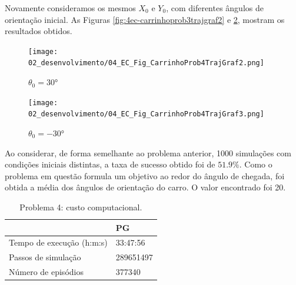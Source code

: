 Novamente consideramos os mesmos $X_0$ e $Y_0$, com diferentes ângulos de orientação inicial. As Figuras \ref{fig:4ec-carrinhoprob3trajgraf2} e \ref{fig:4ec-carrinhoprob4trajgraf3}, mostram os resultados obtidos.

\begin{figure}[H]
	\centering
	\texttt{[image: 02\_desenvolvimento/04\_EC\_Fig\_CarrinhoProb4TrajGraf2.png]}
	\caption{$\theta_0=\ang{30}$}
	\label{fig:4ec-carrinhoprob4trajgraf2}
\end{figure}

\begin{figure}[H]
	\centering
	\texttt{[image: 02\_desenvolvimento/04\_EC\_Fig\_CarrinhoProb4TrajGraf3.png]}
	\caption{$\theta_0=\ang{-30}$}
	\label{fig:4ec-carrinhoprob4trajgraf3}
\end{figure}

Ao considerar, de forma semelhante ao problema anterior, 1000 simulações com condições iniciais distintas, a taxa de sucesso obtido foi de $51.9\%$. Como o problema em questão formula um objetivo ao redor do ângulo de chegada, foi obtida a média dos ângulos de orientação do carro. O valor encontrado foi 20\degree.

\begin{table}[H]
	\centering
	\begin{tabular}{l|l} \toprule
		{} & {{PG}} \\ \midrule
		{{Tempo de execução (h:m:s)}} & {33:47:56} \\
		{{Passos de simulação}} & {289651497} \\
		{{Número de episódios}} & {377340} \\
		\bottomrule
	\end{tabular}
	\caption{Problema 4: custo computacional.}\label{tab:4ec-carrinhoprob4custocomp}
\end{table}
